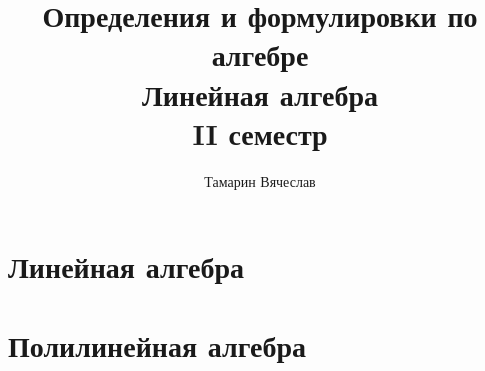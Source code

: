 \documentclass[a4,11pt,dvipsnames]{report}
\title{Определения и формулировки по алгебре\\Линейная алгебра\\II семестр}
\author{Тамарин Вячеслав}
\begin{document}
\maketitle
\tableofcontents
\clearpage

\chapter{Линейная алгебра}
 
 
 
 
 
 
 
 
 
 
 
 
 
 
 
 
 
 
 
 
 
\clearpage
\chapter{Полилинейная алгебра}
 
\end{document}
